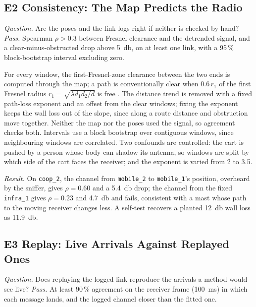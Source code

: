 

\subsection{E2 Consistency: The Map Predicts the Radio}
\emph{Question.} Are the poses and the link logs right if neither is
checked by hand? \emph{Pass.} Spearman $\rho > 0.3$ between Fresnel
clearance and the detrended signal, and a clear-minus-obstructed drop
above \SI{5}{\decibel}, on at least one link, with a 95\,\% block-bootstrap
interval excluding zero.

For every window, the first-Fresnel-zone clearance between the two ends
is computed through the map; a path is conventionally clear when
$0.6\,r_1$ of the first Fresnel radius $r_1 = \sqrt{\lambda d_1 d_2/d}$ is
free \cite{itup530}. The distance trend is removed with a fixed
path-loss exponent and an offset from the clear windows; fixing the
exponent keeps the wall loss out of the slope, since along a route
distance and obstruction move together. Neither the map nor the poses
used the signal, so agreement checks both. Intervals use a block
bootstrap over contiguous windows, since neighbouring windows are
correlated. Two confounds are controlled: the cart is pushed by a person
whose body can shadow its antenna, so windows are split by which side of
the cart faces the receiver; and the exponent is varied from 2 to 3.5.

\emph{Result.} On \texttt{coop\_2}, the channel from \texttt{mobile\_2}
to \texttt{mobile\_1}'s position, overheard by the sniffer, gives
$\rho = 0.60$ and a \SI{5.4}{\decibel} drop; the channel from the fixed
\texttt{infra\_1} gives $\rho = 0.23$ and \SI{4.7}{\decibel} and fails,
consistent with a mast whose path to the moving receiver changes less.
A self-test recovers a planted \SI{12}{\decibel} wall loss as
\SI{11.9}{\decibel}. 



\subsection{E3 Replay: Live Arrivals Against Replayed Ones}
\emph{Question.} Does replaying the logged link reproduce the arrivals a
method would see live? \emph{Pass.} At least 90\,\% agreement on the
receiver frame (\SI{100}{\milli\second}) in which each message lands, and
the logged channel closer than the fitted one.

